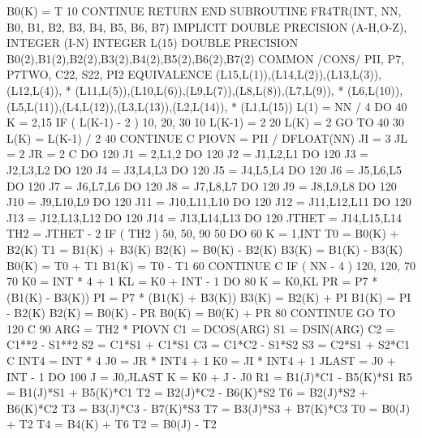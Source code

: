           B0(K) = T
10    CONTINUE
      RETURN
      END
      SUBROUTINE FR4TR(INT, NN, B0, B1, B2, B3, B4, B5, B6, B7)
      IMPLICIT DOUBLE PRECISION (A-H,O-Z), INTEGER (I-N)
      INTEGER L(15)
      DOUBLE PRECISION B0(2),B1(2),B2(2),B3(2),B4(2),B5(2),B6(2),B7(2)
      COMMON /CONS/ PII, P7, P7TWO, C22, S22, PI2
      EQUIVALENCE (L15,L(1)),(L14,L(2)),(L13,L(3)),(L12,L(4)),
     *  (L11,L(5)),(L10,L(6)),(L9,L(7)),(L8,L(8)),(L7,L(9)),
     *  (L6,L(10)),(L5,L(11)),(L4,L(12)),(L3,L(13)),(L2,L(14)),
     *  (L1,L(15))
      L(1) = NN / 4
      DO 40 K = 2,15
          IF ( L(K-1) - 2 ) 10, 20, 30
10        L(K-1) = 2
20        L(K) =  2
          GO TO 40
30        L(K) = L(K-1) / 2
40    CONTINUE
C
      PIOVN = PII / DFLOAT(NN)
      JI = 3
      JL = 2
      JR = 2
C
      DO  120 J1 = 2,L1,2
      DO  120 J2 = J1,L2,L1
      DO  120 J3 = J2,L3,L2
      DO  120 J4 = J3,L4,L3
      DO  120 J5 = J4,L5,L4
      DO  120 J6 = J5,L6,L5
      DO  120 J7 = J6,L7,L6
      DO  120 J8 = J7,L8,L7
      DO  120 J9 = J8,L9,L8
      DO  120 J10 = J9,L10,L9
      DO  120 J11 = J10,L11,L10
      DO  120 J12 = J11,L12,L11
      DO  120 J13 = J12,L13,L12
      DO  120 J14 = J13,L14,L13
      DO  120 JTHET = J14,L15,L14
           TH2 = JTHET - 2
           IF ( TH2 ) 50, 50, 90
50         DO 60 K = 1,INT
               T0 = B0(K) + B2(K)
               T1 = B1(K) + B3(K)
               B2(K) = B0(K) - B2(K)
               B3(K) = B1(K) - B3(K)
               B0(K) = T0 + T1
               B1(K) = T0 - T1
60         CONTINUE
C
           IF ( NN - 4 ) 120, 120, 70
70         K0 = INT * 4 + 1
           KL = K0 + INT - 1
           DO 80 K = K0,KL
               PR = P7 * (B1(K) - B3(K))
               PI = P7 * (B1(K) + B3(K))
               B3(K) = B2(K) + PI
               B1(K) = PI - B2(K)
               B2(K) = B0(K) - PR
               B0(K) = B0(K) + PR
80         CONTINUE
           GO TO 120
C
90         ARG = TH2 * PIOVN
           C1 = DCOS(ARG)
           S1 = DSIN(ARG)
           C2 = C1**2 - S1**2
           S2 = C1*S1 + C1*S1
           C3 = C1*C2 - S1*S2
           S3 = C2*S1 + S2*C1
C
           INT4 = INT * 4
           J0 = JR * INT4 + 1
           K0 = JI * INT4 + 1
           JLAST = J0 + INT - 1
           DO 100 J = J0,JLAST
              K = K0 + J - J0
              R1 = B1(J)*C1 - B5(K)*S1
              R5 = B1(J)*S1 + B5(K)*C1
              T2 = B2(J)*C2 - B6(K)*S2
              T6 = B2(J)*S2 + B6(K)*C2
              T3 = B3(J)*C3 - B7(K)*S3
              T7 = B3(J)*S3 + B7(K)*C3
              T0 = B0(J) + T2
              T4 = B4(K) + T6
              T2 = B0(J) - T2
